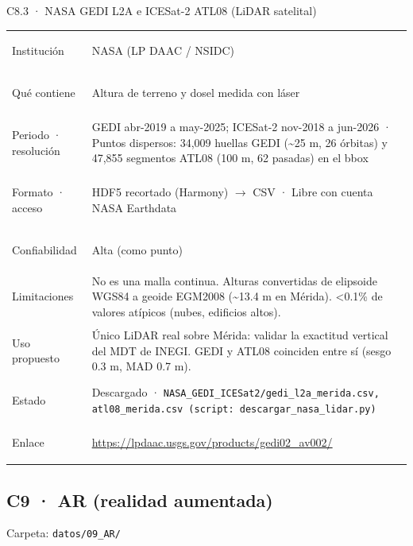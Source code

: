 \documentclass[11pt,a4paper]{article}
\begin{document}
\begin{ficha}{C8.3 · NASA GEDI L2A e ICESat-2 ATL08 (LiDAR satelital)}
\begin{tabularx}{\linewidth}{@{}>{\leavevmode\color{tinta2}\bfseries\raggedright\arraybackslash}p{2.9cm}X@{}}
Institución & NASA (LP DAAC / NSIDC) \\
Qué contiene & Altura de terreno y dosel medida con láser \\
Periodo · resolución & GEDI abr-2019 a may-2025; ICESat-2 nov-2018 a jun-2026 · Puntos dispersos: 34,009 huellas GEDI (\textasciitilde{}25 m, 26 órbitas) y 47,855 segmentos ATL08 (100 m, 62 pasadas) en el bbox \\
Formato · acceso & HDF5 recortado (Harmony) $\rightarrow$ CSV · Libre con cuenta NASA Earthdata \\
Confiabilidad & Alta (como punto) \\
Limitaciones & No es una malla continua. Alturas convertidas de elipsoide WGS84 a geoide EGM2008 (\textasciitilde{}13.4 m en Mérida). <0.1\% de valores atípicos (nubes, edificios altos). \\
Uso propuesto & Único LiDAR real sobre Mérida: validar la exactitud vertical del MDT de INEGI. GEDI y ATL08 coinciden entre sí (sesgo 0.3 m, MAD 0.7 m). \\
Estado & Descargado · {\small\nolinkurl{NASA_GEDI_ICESat2/gedi_l2a_merida.csv, atl08_merida.csv (script: descargar_nasa_lidar.py)}} \\
Enlace & \url{https://lpdaac.usgs.gov/products/gedi02_av002/} \\
\end{tabularx}
\end{ficha}
\subsection{C9 · AR (realidad aumentada)}
{\small\color{tinta2}Carpeta: \nolinkurl{datos/09_AR/}}
\end{document}
